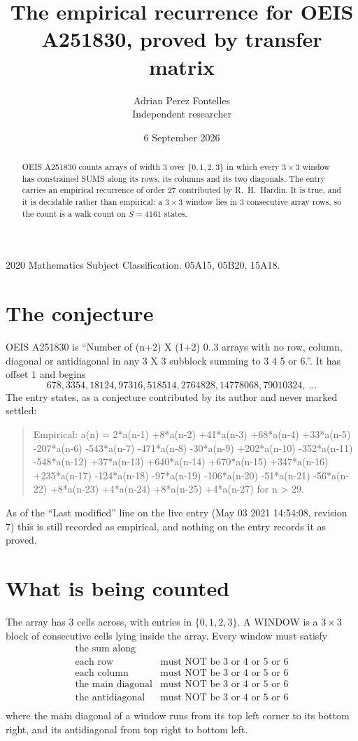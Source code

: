 \documentclass[11pt,a4paper]{article}
\title{The empirical recurrence for OEIS A251830, proved by transfer matrix}
\author{Adrian Perez Fontelles\\ \small Independent researcher}
\date{6 September 2026}
\theoremstyle{plain}
\theoremstyle{definition}
\begin{document}
\maketitle

\begin{abstract}
OEIS A251830 counts arrays of width $3$ over $\{0,1,2,3\}$ in which every $3\times3$ window has
constrained SUMS along its rows, its columns and its two diagonals. The entry carries an
empirical recurrence of order $27$ contributed by R.~H.~Hardin. It is true, and it is
decidable rather than empirical: a $3\times3$ window lies in $3$ consecutive array rows,
so the count is a walk count on $S=4161$ states.
\end{abstract}

\noindent\small 2020 Mathematics Subject Classification. 05A15, 05B20, 15A18.\normalsize

\section{The conjecture}

OEIS A251830 is ``Number of (n+2) X (1+2) 0..3 arrays with no row, column, diagonal or antidiagonal in any 3 X 3 subblock summing to 3 4 5 or 6.''. It has offset $1$ and begins
\[
678, 3354, 18124, 97316, 518514, 2764828, 14778068, 79010324,\ \dots
\]
The entry states, as a conjecture contributed by its author and never marked settled:
\begin{quote}
Empirical: a(n) = 2*a(n-1) +8*a(n-2) +41*a(n-3) +68*a(n-4) +33*a(n-5) -207*a(n-6) -543*a(n-7) -471*a(n-8) -30*a(n-9) +202*a(n-10) -352*a(n-11) -548*a(n-12) +37*a(n-13) +640*a(n-14) +670*a(n-15) +347*a(n-16) +235*a(n-17) -124*a(n-18) -97*a(n-19) -106*a(n-20) -51*a(n-21) -56*a(n-22) +8*a(n-23) +4*a(n-24) +8*a(n-25) +4*a(n-27) for n > 29.
\end{quote}
As of the ``Last modified'' line on the live entry (May 03 2021 14:54:08, revision 7) this is still
recorded as empirical, and nothing on the entry records it as proved.

\section{What is being counted}

The array has $3$ cells across, with entries in $\{0,1,2,3\}$. A WINDOW is a $3\times3$ block
of consecutive cells lying inside the array. Every window must satisfy
\[
\begin{array}{ll}
\text{the sum along} & \text{} \\[2pt]
\text{each row} & \text{must NOT be 3 or 4 or 5 or 6} \\
\text{each column} & \text{must NOT be 3 or 4 or 5 or 6} \\
\text{the main diagonal} & \text{must NOT be 3 or 4 or 5 or 6} \\
\text{the antidiagonal} & \text{must NOT be 3 or 4 or 5 or 6} \\
\end{array}
\]
where the main diagonal of a window runs from its top left corner to its bottom right, and its
antidiagonal from top right to bottom left.
\end{document}
